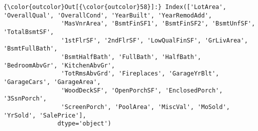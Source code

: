 \documentclass[11pt]{article}
\begin{document}
\begin{Verbatim}[commandchars=\\\{\}]
{\color{outcolor}Out[{\color{outcolor}58}]:} Index(['LotArea', 'OverallQual', 'OverallCond', 'YearBuilt', 'YearRemodAdd',
                'MasVnrArea', 'BsmtFinSF1', 'BsmtFinSF2', 'BsmtUnfSF', 'TotalBsmtSF',
                '1stFlrSF', '2ndFlrSF', 'LowQualFinSF', 'GrLivArea', 'BsmtFullBath',
                'BsmtHalfBath', 'FullBath', 'HalfBath', 'BedroomAbvGr', 'KitchenAbvGr',
                'TotRmsAbvGrd', 'Fireplaces', 'GarageYrBlt', 'GarageCars', 'GarageArea',
                'WoodDeckSF', 'OpenPorchSF', 'EnclosedPorch', '3SsnPorch',
                'ScreenPorch', 'PoolArea', 'MiscVal', 'MoSold', 'YrSold', 'SalePrice'],
               dtype='object')
\end{Verbatim}
            
\end{document}
